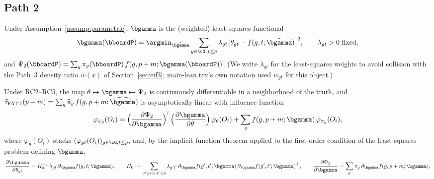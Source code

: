 \documentclass{article}
\renewcommand{\P}{\bboardP}
\begin{document}
\subsection{Path 2}
\label{sec:eif2}

Under Assumption~\ref{assump:parametric}, $\bgamma$ is the (weighted) least-squares functional
\[
\bgamma(\P) = \argmin_{\tilde\bgamma} \sum_{g\in\cG,\,t\leq p} \lambda_{gt}\bigl[\theta_{gt}-f(g,t;\tilde\bgamma)\bigr]^2, \qquad \lambda_{gt} > 0 \text{ fixed},
\]
and $\Psi_2(\P) = \sum_g \pi_g(\P)\,f(g,p+m;\bgamma(\P))$. (We write $\lambda_{gt}$ for the least-squares weights to avoid collision with the Path~3 density ratio $w(x)$ of Section~\ref{sec:eif3}; main-lean.tex's own notation used $w_{gt}$ for this object.)

\begin{proposition}
\label{prop:eif2}
Under RC2--RC5, the map $\theta \mapsto \bgamma \mapsto \Psi_2$ is continuously differentiable in a neighborhood of the truth, and $\widehat\tau_{\mathrm{FATT}}(p+m) = \sum_g\widehat\pi_g\,f(g,p+m;\widehat{\bgamma})$ is asymptotically linear with influence function
\[
\varphi_{\psi_2}(O_i) = \Bigl(\frac{\partial \Psi_2}{\partial \bgamma}\Bigr)^{\!\top} \Bigl(\frac{\partial \bgamma}{\partial \theta}\Bigr)\,\varphi_\theta(O_i) + \sum_g f(g,p+m;\bgamma)\,\varphi_{\pi_g}(O_i),
\]
where $\varphi_\theta(O_i)$ stacks $(\varphi_{gt}(O_i))_{g\in\cG,t\leq p}$, and, by the implicit function theorem applied to the first-order condition of the least-squares problem defining $\bgamma$,
\[
\frac{\partial \bgamma}{\partial \theta_{gt}} = H_0^{-1}\, \lambda_{gt}\,\partial_{\bgamma}f(g,t;\bgamma), \qquad H_0 := \sum_{g'\in\cG,t'\leq p} \lambda_{g't'}\,\partial_{\bgamma}f(g',t';\bgamma)\,\partial_{\bgamma}f(g',t';\bgamma)^\top, \qquad \frac{\partial \Psi_2}{\partial\bgamma} = \sum_g \pi_g\,\partial_{\bgamma} f(g,p+m;\bgamma).
\]
\end{proposition}
\end{document}
